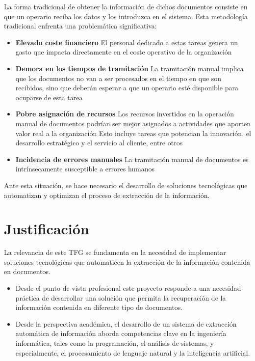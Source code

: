La forma tradicional de obtener la información de dichos documentos consiste en que un operario reciba los datos y los
introduzca en el sistema.
Esta metodología tradicional enfrenta una problemática significativa:

\begin{itemize}
    \item \textbf{Elevado coste financiero}
    El personal dedicado a estas tareas genera un gasto que impacta directamente en el coste operativo de la
    organización
    \item \textbf{Demora en los tiempos de tramitación}
    La tramitación manual implica que los documentos no van a ser procesados en el tiempo en que son recibidos, sino
    que deberán esperar a que un operario esté disponible para ocuparse de esta tarea
    \item \textbf{Pobre asignación de recursos}
    Los recursos invertidos en la operación manual de documentos podrían ser mejor asignados a actividades que aporten
    valor real a la organización
    Esto incluye tareas que potencian la innovación, el desarrollo estratégico y el servicio al cliente, entre otros
    \item \textbf{Incidencia de errores manuales}
    La tramitación manual de documentos es intrínsecamente susceptible a errores humanos
\end{itemize}

Ante esta situación, se hace necesario el desarrollo de soluciones tecnológicas que automatizan y optimizan el proceso
de extracción de la información.


\section{Justificación}

La relevancia de este TFG se fundamenta en la necesidad de implementar soluciones tecnológicas que automaticen la
extracción de la información contenida en documentos.

\begin{itemize}
    \item
    Desde el punto de vista profesional este proyecto responde a una necesidad práctica de desarrollar una solución
    que permita la recuperación de la información contenida en diferente tipo de documentos.
    \item Desde la perspectiva académica, el desarrollo de un sistema de extracción automática de información aborda
    competencias clave en la ingeniería informática, tales como la programación, el análisis de sistemas, y
    especialmente, el procesamiento de lenguaje natural y la inteligencia artificial.
\end{itemize}

